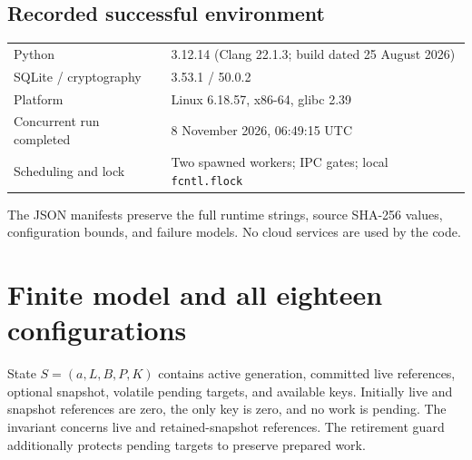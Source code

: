 \documentclass[10pt]{article}
\begin{document}
\subsection*{Recorded successful environment}
\begin{center}\begin{tabular}{@{}ll@{}}
\toprule
Python & 3.12.14 (Clang 22.1.3; build dated 25 August 2026)\\
SQLite / cryptography & 3.53.1 / 50.0.2\\
Platform & Linux 6.18.57, x86-64, glibc 2.39\\
Concurrent run completed & 8 November 2026, 06:49:15 UTC\\
Scheduling and lock & Two spawned workers; IPC gates; local \texttt{fcntl.flock}\\
\bottomrule
\end{tabular}\end{center}
The JSON manifests preserve the full runtime strings, source SHA-256 values,
configuration bounds, and failure models. No cloud services are used by the code.

\newpage
\section{Finite model and all eighteen configurations}
State $S=(a,L,B,P,K)$ contains active generation, committed live references,
optional snapshot, volatile pending targets, and available keys. Initially live
and snapshot references are zero, the only key is zero, and no work is pending.
The invariant concerns live and retained-snapshot references. The retirement
guard additionally protects pending targets to preserve prepared work.
\end{document}
